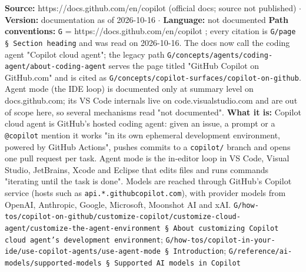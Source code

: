 \textbf{Source:} https://docs.github.com/en/copilot (official docs; source not published) $\cdot$ \textbf{Version:} documentation as of 2026-10-16 $\cdot$ \textbf{Language:} not documented
\textbf{Path conventions:} \texttt{G} = https://docs.github.com/en/copilot ; every citation is \texttt{G/\allowbreak{}page § Section heading} and was read on 2026-10-16. The docs now call the coding agent "Copilot cloud agent"; the legacy path \texttt{G/\allowbreak{}concepts/\allowbreak{}agents/\allowbreak{}coding-\allowbreak{}agent/\allowbreak{}about-\allowbreak{}coding-\allowbreak{}agent} serves the page titled "GitHub Copilot on GitHub.com" and is cited as \texttt{G/\allowbreak{}concepts/\allowbreak{}copilot-\allowbreak{}surfaces/\allowbreak{}copilot-\allowbreak{}on-\allowbreak{}github}. Agent mode (the IDE loop) is documented only at summary level on docs.github.com; its VS Code internals live on code.visualstudio.com and are out of scope here, so several mechanisms read "not documented".
\textbf{What it is:} Copilot cloud agent is GitHub's hosted coding agent: given an issue, a prompt or a \texttt{@copilot} mention it works "in its own ephemeral development environment, powered by GitHub Actions", pushes commits to a \texttt{copilot/\allowbreak{}} branch and opens one pull request per task. Agent mode is the in-editor loop in VS Code, Visual Studio, JetBrains, Xcode and Eclipse that edits files and runs commands "iterating until the task is done". Models are reached through GitHub's Copilot service (hosts such as \texttt{api.\allowbreak{}*.\allowbreak{}githubcopilot.\allowbreak{}com}), with provider models from OpenAI, Anthropic, Google, Microsoft, Moonshot AI and xAI. \texttt{G/\allowbreak{}how-\allowbreak{}tos/\allowbreak{}copilot-\allowbreak{}on-\allowbreak{}github/\allowbreak{}customize-\allowbreak{}copilot/\allowbreak{}customize-\allowbreak{}cloud-\allowbreak{}agent/\allowbreak{}customize-\allowbreak{}the-\allowbreak{}agent-\allowbreak{}environment § About customizing Copilot cloud agent's development environment}; \texttt{G/\allowbreak{}how-\allowbreak{}tos/\allowbreak{}copilot-\allowbreak{}in-\allowbreak{}your-\allowbreak{}ide/\allowbreak{}use-\allowbreak{}copilot-\allowbreak{}agents/\allowbreak{}use-\allowbreak{}agent-\allowbreak{}mode § Introduction}; \texttt{G/\allowbreak{}reference/\allowbreak{}ai-\allowbreak{}models/\allowbreak{}supported-\allowbreak{}models § Supported AI models in Copilot}

